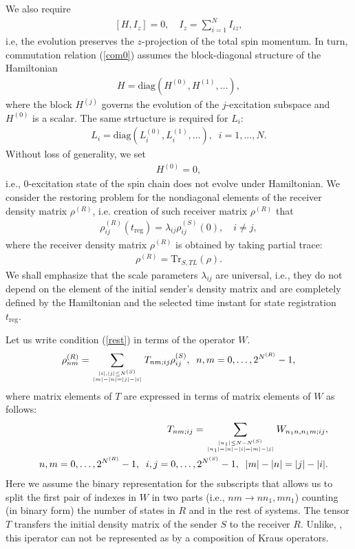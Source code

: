 \documentclass[pra,preprint,showpacs]{revtex4-1}
\begin{document}
We also require
\begin{eqnarray}\label{com0}
[H,I_z]=0,\quad I_z= \sum_{i=1}^N I_{iz},
\end{eqnarray}
i.e, the evolution preserves the $z$-projection of the total spin momentum.
In turn, commutation relation (\ref{com0}) assumes the block-diagonal structure of the Hamiltonian
\begin{eqnarray}\label{bH}
H={\mbox{diag}} (H^{(0)},H^{(1)},\dots ),
\end{eqnarray}
where the  block $H^{(j)}$ governs the evolution of the $j$-excitation subspace and $H^{(0)}$ is a scalar.
The same strtucture is required for $L_i$:
\begin{eqnarray}\label{bH}
L_i={\mbox{diag}} (L_i^{(0)},L_i^{(1)},\dots ), \;\; i=1,\dots,N.
\end{eqnarray}
Without loss of generality, we set
\begin{eqnarray}\label{bH0}
H^{(0)}=0,
\end{eqnarray}
i.e., 0-excitation state of the spin chain does not evolve under Hamiltonian.
We consider the restoring problem for the  nondiagonal elements of the receiver density matrix $\rho^{(R)}$,
i.e. creation of such receiver matrix $\rho^{(R)}$ that
\begin{eqnarray}\label{rest}
\rho^{(R)}_{ij}(t_{\mathrm{reg}}) = \lambda_{ij} \rho^{(S)}_{ij}(0), \quad i\neq j,
\end{eqnarray}
where the receiver density matrix $\rho^{(R)}$ is obtained by taking partial trace:
\begin{eqnarray}\label{R}
\rho^{(R)}={\mbox{Tr}}_{S,TL}(\rho).
\end{eqnarray}
We shall emphasize that the scale parameters $\lambda_{ij}$ are universal, i.e., they do not depend on the element of  the initial sender's density matrix and are completely defined by the Hamiltonian and the selected time instant for state registration {$t_{\mathrm{reg}}$}.

Let us write condition (\ref{rest}) in terms of the operator $W$.
\begin{eqnarray}\label{rhoR}
\rho^{(R)}_{nm} = \sum_{{|i|,|j|\le N^{(S)}}\atop{|m|-|n|=|j|-|i|}} T_{nm;ij} \rho^{(S)}_{ij}, \;\;n,m = 0,\dots,2^{N^{(R)}}-1,
\end{eqnarray}
where matrix elements of $T$ are expressed in terms of matrix elements of $W$ as follows:
\begin{eqnarray}\label{TT}
&&T_{nm;ij}=\sum_{{|n_1| \le N-N^{(S)}}\atop{|n_1|=|n|-|i|=|m|-|j|}}W_{n_1n,n_1m ;ij}, \\\nonumber
&&n,m=0,\dots,2^{N^{(R)}}-1,\;\;i,j=0,\dots,2^{N^{(S)}}-1,\;\;|m|-|n|=|j|-|i|.
\end{eqnarray}
Here we assume the binary representation for the subscripts that allows us to split the first pair of indexes in $W$ in two parts (i.e., $nm\to n n_1,mn_1$) counting (in binary form) the number of states in $R$ and in the rest of systems.
The tensor $T$ transfers the initial  density matrix of the sender $S$  to the receiver $R$. Unlike, \cite{}, this iperator can not be represented as  by a composition of Kraus operators.
\end{document}
